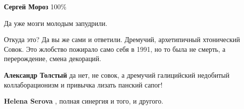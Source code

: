 \begin{itemize}
\begin{itemize}
 
\textbf{Сергей Мороз} 100\%
\end{itemize}

 
Да уже мозги молодым запудрили.

 

Откуда это? Да вы же сами и ответили. Дремучий, архетипичный хтонический Совок.
Это жлобство пожирало само себя в 1991, но то была не смерть, а перерождение,
смена декораций.

\begin{itemize}
 
\textbf{Александр Толстый} да нет, не совок, а дремучий галицийский недобитый коллаборационизм и привычка лизать панский сапог!

 
\textbf{Helena Serova} , полная синергия и того, и другого.
\end{itemize}

 

\end{itemize}
